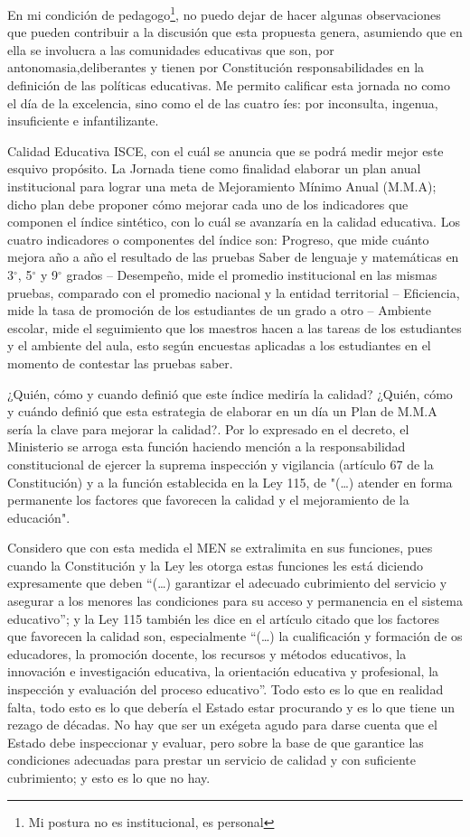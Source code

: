 \documentclass[10pt]{article}
\begin{document}
En mi condición de pedagogo\footnote{Mi	postura	no es institucional, es personal}, no puedo dejar de hacer algunas observaciones que pueden contribuir a la discusión que esta propuesta genera, asumiendo que en ella se involucra a las comunidades educativas que son, por antonomasia,deliberantes y tienen por Constitución responsabilidades en la definición de las políticas educativas. Me permito calificar esta jornada no como el día de la excelencia, sino como el de las cuatro íes: por inconsulta, ingenua, insuficiente e infantilizante.

Calidad Educativa ISCE, con el cuál se anuncia que se podrá medir mejor este esquivo propósito. La Jornada tiene como finalidad elaborar un plan anual institucional para lograr una meta de Mejoramiento Mínimo Anual (M.M.A); dicho plan debe proponer cómo mejorar cada uno de los indicadores que componen el índice sintético, con lo cuál se avanzaría en la calidad educativa. Los cuatro indicadores o componentes del índice son: Progreso, que mide cuánto mejora año a año el resultado de las pruebas Saber de lenguaje y matemáticas en 3$^{\circ}$, 5$^{\circ}$ y 9$^{\circ}$ grados -- Desempeño, mide el promedio institucional en las mismas pruebas, comparado con el promedio nacional y la entidad territorial -- Eficiencia, mide la tasa de promoción de los estudiantes de un grado a otro -- Ambiente escolar, mide el seguimiento que los maestros hacen a las tareas de los estudiantes y el ambiente del aula, esto según encuestas aplicadas a los estudiantes en el momento de contestar las pruebas saber.

¿Quién, cómo y cuando definió que este índice mediría la calidad? ¿Quién, cómo y cuándo definió que esta estrategia de elaborar en un día un Plan de M.M.A sería la clave para mejorar la calidad?. Por lo expresado en el decreto, el Ministerio se
arroga esta función haciendo mención a la responsabilidad constitucional de ejercer la suprema inspección y vigilancia (artículo 67 de la Constitución) y a la función establecida en la Ley 115, de  "(\ldots) atender en forma permanente los factores que favorecen la calidad y el mejoramiento de la educación".

Considero que con esta medida el MEN se extralimita en sus funciones, pues cuando la Constitución y la Ley les otorga estas funciones les está diciendo expresamente que deben “(\ldots) garantizar el adecuado cubrimiento del servicio y asegurar a los menores las condiciones para su acceso y permanencia en el sistema educativo”; y la Ley 115 también les dice en el artículo citado que los factores que favorecen la calidad son, especialmente “(\ldots) la cualificación y
formación de os educadores, la promoción docente, los recursos y métodos educativos, la innovación e investigación educativa, la orientación educativa y profesional, la inspección y evaluación del proceso educativo”. Todo esto es lo que en realidad falta, todo esto es lo que debería el Estado estar procurando y es lo que tiene un rezago de décadas. No hay que ser un exégeta agudo para darse cuenta que el Estado debe inspeccionar y evaluar, pero sobre la base de que garantice las condiciones adecuadas para prestar un servicio de calidad y con
suficiente cubrimiento; y esto es lo que no hay.
\end{document}
